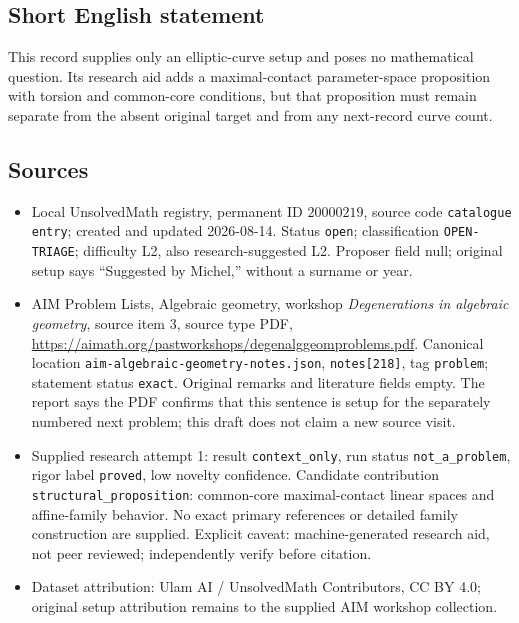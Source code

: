 \documentclass[11pt]{article}
\begin{document}
\subsection{Short English statement}
This record supplies only an elliptic-curve setup and poses no mathematical question. Its research aid adds a maximal-contact parameter-space proposition with torsion and common-core conditions, but that proposition must remain separate from the absent original target and from any next-record curve count.
\subsection{Sources}
\begin{itemize}
\item Local UnsolvedMath registry, permanent ID $20000219$, source code \texttt{catalogue entry}; created and updated 2026-08-14. Status \texttt{open}; classification \texttt{OPEN-TRIAGE}; difficulty L2, also research-suggested L2. Proposer field null; original setup says ``Suggested by Michel,'' without a surname or year.
\item AIM Problem Lists, Algebraic geometry, workshop \emph{Degenerations in algebraic geometry}, source item 3, source type PDF, \url{https://aimath.org/pastworkshops/degenalggeomproblems.pdf}. Canonical location \texttt{aim-algebraic-geometry-notes.json}, \texttt{notes[218]}, tag \texttt{problem}; statement status \texttt{exact}. Original remarks and literature fields empty. The report says the PDF confirms that this sentence is setup for the separately numbered next problem; this draft does not claim a new source visit.
\item Supplied research attempt 1: result \texttt{context\_only}, run status \texttt{not\_a\_problem}, rigor label \texttt{proved}, low novelty confidence. Candidate contribution \texttt{structural\_proposition}: common-core maximal-contact linear spaces and affine-family behavior. No exact primary references or detailed family construction are supplied. Explicit caveat: machine-generated research aid, not peer reviewed; independently verify before citation.
\item Dataset attribution: Ulam AI / UnsolvedMath Contributors, CC BY 4.0; original setup attribution remains to the supplied AIM workshop collection.
\end{itemize}
\end{document}

